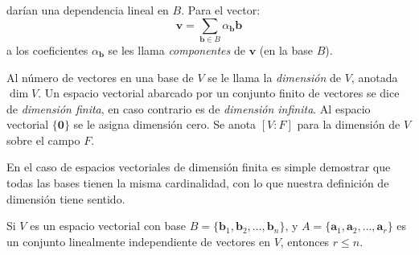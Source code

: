   darían una dependencia lineal en \(B\).
  Para el vector:
  \begin{equation*}
    \boldsymbol{v}
      = \sum_{\boldsymbol{b} \in B}
	  \alpha_{\boldsymbol{b}} \boldsymbol{b}
  \end{equation*}
  a los coeficientes \(\alpha_{\boldsymbol{b}}\)
  se les llama \emph{componentes} de \(\boldsymbol{v}\)%
  (en la base \(B\)).
  \begin{definition}
    Al número de vectores en una base de \(V\)
    se le llama la \emph{dimensión} de \(V\),
    anotada \(\dim V\).
    Un espacio vectorial abarcado por un conjunto finito de vectores
    se dice de \emph{dimensión finita},
    en caso contrario es de \emph{dimensión infinita}.
    Al espacio vectorial \(\{\boldsymbol{0}\}\)
    se le asigna dimensión cero.
    Se anota \([V : F]\)
    para la dimensión de \(V\) sobre el campo \(F\).
  \end{definition}
  En el caso de espacios vectoriales de dimensión finita
  es simple demostrar que todas las bases
  tienen la misma cardinalidad,
  con lo que nuestra definición de dimensión tiene sentido.
  \begin{theorem}
    \label{theo:espacio-vectorial-li}
    Si \(V\) es un espacio vectorial
    con base
      \(B = \{\boldsymbol{b}_1, \boldsymbol{b}_2,
	       \dotsc, \boldsymbol{b}_n\}\),
    y \(A = \{\boldsymbol{a}_1, \boldsymbol{a}_2,
	       \dotsc, \boldsymbol{a}_r\}\)
    es un conjunto linealmente independiente de vectores en \(V\),
    entonces \(r \le n\).
  \end{theorem}
